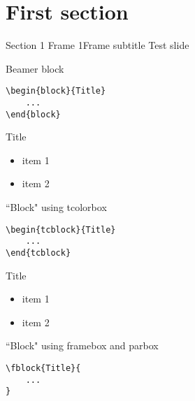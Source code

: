 \section{First section}


\begin{frame}{Section 1 Frame 1}{Frame subtitle}
    Test slide
\end{frame}


\begin{frame}[fragile]{Beamer block}
	\begin{verbatim}
\begin{block}{Title}
    ...
\end{block}
    \end{verbatim}

    \begin{block}{Title}
        \begin{itemize}
            \item item 1
            \item item 2
        \end{itemize}
    \end{block}
\end{frame}


\begin{frame}[fragile]{``Block" using tcolorbox}
	\begin{verbatim}
\begin{tcblock}{Title}
    ...
\end{tcblock}
    \end{verbatim}

    \begin{tcblock}{Title}
        \begin{itemize}
            \item item 1
            \item item 2
        \end{itemize}
    \end{tcblock}
\end{frame}


\begin{frame}[fragile]{``Block" using framebox and parbox}
    \begin{verbatim}
\fblock{Title}{
    ...
}
    \end{verbatim}
	
\end{frame}



